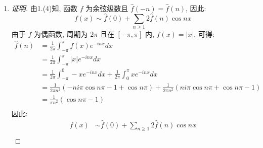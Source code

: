 \documentclass{article}
\begin{document}
\begin{enumerate}
\begin{proof}[证明]
\begin{equation}
\begin{aligned}
                &=\frac{1}{2\pi}\int_{-\pi}^{0}x(x+\pi)e^{-inx}dx+\frac{1}{2\pi}\int_{0}^{\pi}x(\pi-x)e^{-inx}dx \\
                &=\frac{2i}{n^3\pi}(\cos n\pi-1) \\
            \end{aligned}
        \end{equation}
        因此:
        \begin{equation}
            \begin{aligned}
                f(x)
                &\sim\sum_{n\geq1}2i\hat{f}(n)\sin nx \\
                &=\sum_{n\geq1}2i\frac{2i}{n^3\pi}(\cos n\pi-1)\sin nx \\
                &=\sum_{n\geq1}\frac{4}{n^3\pi}(1-\cos n\pi)\sin nx \\
            \end{aligned}
        \end{equation}
    \end{proof}
    \item \begin{proof}[证明]
        由1.(4)知, 函数 $f$ 为余弦级数且 $\hat{f}(-n)=\hat{f}(n)$, 因此:
        \begin{equation}
            f(x)\sim\hat{f}(0)+\sum_{n\geq1}2\hat{f}(n)\cos nx
        \end{equation}
        由于 $f$ 为偶函数, 周期为 $2\pi$ 且在 $[-\pi,\pi]$ 内, $f(x)=\left|x\right|$, 可得:
        \begin{equation}
            \begin{aligned}
                \hat{f}(n)
                &=\frac{1}{2\pi}\int_{-\pi}^{\pi}f(x)e^{-inx}dx \\
                &=\frac{1}{2\pi}\int_{-\pi}^{\pi}|x|e^{-inx}dx \\
                &=\frac{1}{2\pi}\int_{-\pi}^{0}-xe^{-inx}dx+\frac{1}{2\pi}\int_{0}^{\pi}xe^{-inx}dx \\
                &=\frac{1}{2\pi n^2}(-ni\pi\cos n\pi-1+\cos n\pi)+\frac{1}{2\pi n^2}(ni\pi\cos n\pi+\cos n\pi-1) \\
                &=\frac{1}{\pi n^2}(\cos n\pi-1) \\
            \end{aligned}
        \end{equation}
        因此:
        \begin{equation}
            \begin{aligned}
                f(x)
                &\sim\hat{f}(0)+\sum_{n\geq1}2\hat{f}(n)\cos nx \\

\end{aligned}
\end{equation}
\end{proof}
\end{enumerate}
\end{document}
